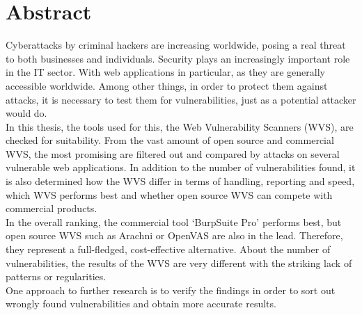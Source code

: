 \documentclass[12pt,oneside,a4paper,parskip,pointlessnumbers]{scrbook}
\begin{document}
\section*{Abstract}
Cyberattacks by criminal hackers are increasing worldwide, posing a real threat to both businesses and individuals. Security plays an increasingly important role in the IT sector. With web applications in particular, as they are generally accessible worldwide. Among other things, in order to protect them against attacks, it is necessary to test them for vulnerabilities, just as a potential attacker would do.\\
In this thesis, the tools used for this, the Web Vulnerability Scanners (WVS), are checked for suitability. From the vast amount of open source and commercial WVS, the most promising are filtered out and compared by attacks on several vulnerable web applications. In addition to the number of vulnerabilities found, it is also determined how the WVS differ in terms of handling, reporting and speed, which WVS performs best and whether open source WVS can compete with commercial products.\\
In the overall ranking, the commercial tool `BurpSuite Pro' performs best, but open source WVS such as Arachni or OpenVAS are also in the lead. Therefore, they represent a full-fledged, cost-effective alternative. About the number of vulnerabilities, the results of the WVS are very different with the striking lack of patterns or regularities.\\
One approach to further research is to verify the findings in order to sort out wrongly found vulnerabilities and obtain more accurate results.
\setcounter{secnumdepth}{3}
\setcounter{tocdepth}{3}
\tableofcontents
\listoffigures
{}
\listoftables
{}
\end{document}

